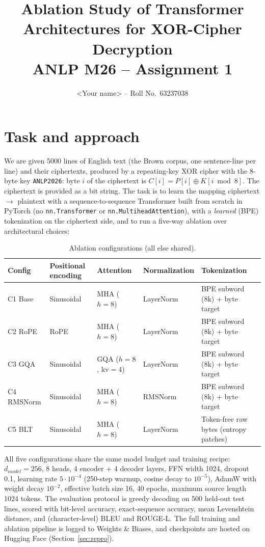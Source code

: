 \documentclass[11pt]{article}
\title{Ablation Study of Transformer Architectures for XOR-Cipher Decryption\\
\large ANLP M26 -- Assignment 1}
\author{<Your name> -- Roll No.~63237038}
\date{}
\begin{document}
\maketitle

\section{Task and approach}
We are given 5000 lines of English text (the Brown corpus, one sentence-line per
line) and their ciphertexts, produced by a repeating-key XOR cipher with the 8-byte
key \texttt{ANLP2026}: byte $i$ of the ciphertext is $C[i] = P[i] \oplus K[i \bmod 8]$.
The ciphertext is provided as a bit string. The task is to learn the mapping
ciphertext $\to$ plaintext with a sequence-to-sequence Transformer built from
scratch in PyTorch (no \texttt{nn.Transformer} or \texttt{nn.MultiheadAttention}),
with a \emph{learned} (BPE) tokenization on the ciphertext side, and to run a
five-way ablation over architectural choices:

\begin{table}[h]
\centering
\caption{Ablation configurations (all else shared).}
\label{tab:configs}
\begin{tabular}{lllll}
\toprule
Config & Positional encoding & Attention & Normalization & Tokenization \\
\midrule
C1 Base     & Sinusoidal & MHA ($h{=}8$) & LayerNorm & BPE subword (8k) + byte target \\
C2 RoPE     & RoPE       & MHA ($h{=}8$) & LayerNorm & BPE subword (8k) + byte target \\
C3 GQA      & Sinusoidal & GQA ($h{=}8$, kv$=4$) & LayerNorm & BPE subword (8k) + byte target \\
C4 RMSNorm  & Sinusoidal & MHA ($h{=}8$) & RMSNorm   & BPE subword (8k) + byte target \\
C5 BLT      & Sinusoidal & MHA ($h{=}8$) & LayerNorm & Token-free raw bytes (entropy patches) \\
\bottomrule
\end{tabular}
\end{table}

All five configurations share the same model budget and training recipe: $d_{model}=256$,
8 heads, 4 encoder + 4 decoder layers, FFN width 1024, dropout 0.1, learning rate
$5\cdot10^{-4}$ (250-step warmup, cosine decay to $10^{-5}$), AdamW with weight decay
$10^{-2}$, effective batch size 16, 40 epochs, maximum source length 1024 tokens.
The evaluation protocol is greedy decoding on 500 held-out test lines, scored with
bit-level accuracy, exact-sequence accuracy, mean Levenshtein distance, and
(character-level) BLEU and ROUGE-L. The full training and ablation pipeline is
logged to Weights \& Biases, and checkpoints are hosted on Hugging Face
(Section~\ref{sec:repro}).
\end{document}
